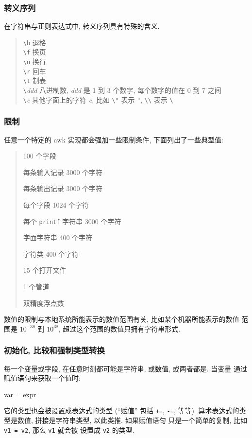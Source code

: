 \subsubsection{转义序列}
在字符串与正则表达式中, 转义序列具有特殊的含义.
\begin{quote}
    \begin{tabbing}
        \verb'\b' \hspace{4em} \= 退格 \\
        \verb'\f' \> 换页 \\
        \verb'\n' \> 换行 \\
        \verb'\r' \> 回车 \\
        \verb'\t' \> 制表 \\
        \verb'\'\textit{ddd} \> 八进制数, \textit{ddd} 是 1 到 3 个数字,
        每个数字的值在 0 到 7 之间 \\
        \verb'\'\textit{c} \> 其他字面上的字符 \textit{c}, 比如 \verb'\"'
        表示 \verb'"', \verb'\\' 表示 \verb'\' \\
    \end{tabbing}
\end{quote}

\subsubsection{限制}
任意一个特定的 awk 实现都会强加一些限制条件, 下面列出了一些典型值:
\begin{quote}
    100 个字段 \par
    每条输入记录 3000 个字符 \par
    每条输出记录 3000 个字符 \par
    每个字段 1024 个字符 \par
    每个 \texttt{printf} 字符串 3000 个字符 \par
    字面字符串 400 个字符 \par
    字符类 400 个字符 \par
    15 个打开文件 \par
    1 个管道 \par
    双精度浮点数
\end{quote}
数值的限制与本地系统所能表示的数值范围有关, 比如某个机器所能表示的数值
范围是 $10^{-38}$ 到  $10^{38}$, 超过这个范围的数值只拥有字符串形式.
\subsubsection{初始化, 比较和强制类型转换}
每一个变量或字段, 在任意时刻都可能是字符串, 或数值, 或两者都是. 当变量
通过赋值语句来获取一个值时:
\begin{awkcode}
    var = expr
\end{awkcode}
它的类型也会被设置成表达式的类型 (``赋值'' 包括 \texttt{+=}, \texttt{-=},
等等). 算术表达式的类型是数值, 拼接是字符串类型, 以此类推. 如果赋值语句
只是一个简单的复制, 比如 \texttt{v1 = v2}, 那么 \texttt{v1} 就会被
设置成 \texttt{v2} 的类型.

